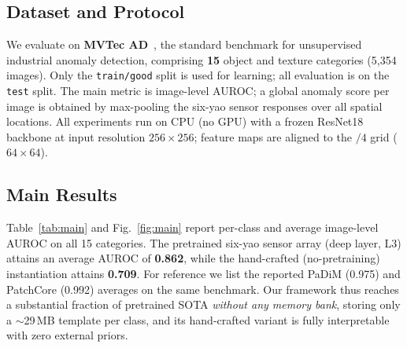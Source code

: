 \documentclass[journal,10pt]{IEEEtran}
\begin{document}
\subsection{Dataset and Protocol}
We evaluate on \textbf{MVTec AD}~\cite{bergmann2019mvtec}, the standard
benchmark for unsupervised industrial anomaly detection, comprising
\textbf{15} object and texture categories (5{,}354 images). Only the
\texttt{train/good} split is used for learning; all evaluation is on the
\texttt{test} split. The main metric is image-level AUROC; a global
anomaly score per image is obtained by max-pooling the six-yao
sensor responses over all spatial locations. All experiments run on CPU
(no GPU) with a frozen ResNet18 backbone at input resolution $256\times256$;
feature maps are aligned to the $/4$ grid ($64\times64$).

\subsection{Main Results}
Table~\ref{tab:main} and Fig.~\ref{fig:main} report per-class and average
image-level AUROC on all 15 categories. The pretrained six-yao sensor array (deep layer, L3)
attains an average AUROC of \textbf{0.862}, while the hand-crafted
(no-pretraining) instantiation attains \textbf{0.709}. For reference we
list the reported PaDiM (0.975) and PatchCore (0.992) averages on the same
benchmark. Our framework thus reaches a substantial fraction of
pretrained SOTA \emph{without any memory bank}, storing only a
$\sim$29\,MB template per class, and its hand-crafted variant is fully
interpretable with zero external priors.
\end{document}
